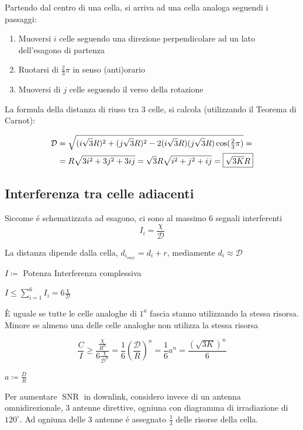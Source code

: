 \documentclass{article}
\DeclareMathOperator\snr{SNR}
\begin{document}
Partendo dal centro di una cella, si arriva ad una cella analoga seguendi i passaggi:
\begin{enumerate}
    \item Muoversi $i$ celle seguendo una direzione perpendicolare ad un lato dell'esagono di partenza
    \item Ruotarsi di $\frac{2}{3}\pi$ in senso (anti)orario
    \item Muoversi di $j$ celle seguendo il verso della rotazione
\end{enumerate}

La formula della distanza di riuso tra 3 celle, si calcola (utilizzando il Teorema di Carnot):

\[
\begin{aligned}
    \mathcal{D} &= \sqrt{(i\sqrt{3}R)^2 + (j\sqrt{3}R)^2 - 2(i\sqrt{3}R)(j\sqrt{3}R)\cos({\textstyle \frac{2}{3}}\pi) } = \\
                &= R\sqrt{3i^2 + 3j^2 + 3ij} = \sqrt{3}R\sqrt{i^2 + j^2 + ij} = \framebox{$\sqrt{3K}R$}
\end{aligned}
\]

\subsection{Interferenza tra celle adiacenti}
Siccome \'e schematizzata ad esagono, ci sono al massimo 6 segnali interferenti
\[ I_i = \frac{\chi}{\mathcal{D}} \]

La distanza dipende dalla cella, $d_{i_{max}} = d_i + r$, mediamente $d_i \approx \mathcal{D}$


$I \coloneqq$ Potenza Interferenza complessiva

$I \le \sum\limits^6_{i=1} I_i = 6\frac{\chi}{\mathcal{D}}$

\`E uguale se tutte le celle analoghe di $1^a$ fascia stanno utilizzando la stessa risorsa. Minore se almeno una delle celle analoghe non utilizza la stessa risorsa

\[
    \frac{C}{I} \ge \frac{\frac{\chi}{R^n}}{6\frac{\chi}{\mathcal{D}^n}} =
    \frac{1}{6}{\left(\frac{\mathcal{D}}{R}\right)}^n =
    \frac{1}{6}a^n = \frac{{(\sqrt{3K})}^n}{6}
\]

$a \coloneqq \frac{D}{R}$

Per aumentare $\snr$ in downlink, considero invece di un antenna omnidirezionale, 3 antenne direttive, ogniuna con diagramma di irradiazione di $120^\circ$. Ad ogniuna delle 3 antenne \'e assegnato $\frac{1}{3}$ delle risorse della cella.
\end{document}
